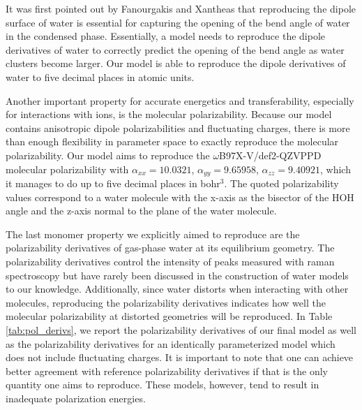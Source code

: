 \documentclass[journal=jctcce,manuscript=article]{achemso}
\begin{document}
It was first pointed out by Fanourgakis and Xantheas that reproducing the dipole surface of water is essential for capturing the opening of the bend angle of water in the condensed phase.\cite{fanourgakis2006flexible} Essentially, a model needs to reproduce the dipole derivatives of water to correctly predict the opening of the bend angle as water clusters become larger. Our model is able to reproduce the dipole derivatives of water to five decimal places in atomic units.

Another important property for accurate energetics and transferability, especially for interactions with ions, is the molecular polarizability. Because our model contains anisotropic dipole polarizabilities and fluctuating charges, there is more than enough flexibility in parameter space to exactly reproduce the molecular polarizability. Our model aims to reproduce the $\omega$B97X-V/def2-QZVPPD molecular polarizability with $\alpha_{xx}=10.0321$, $\alpha_{yy}=9.65958$, $\alpha_{zz}=9.40921$, which it manages to do up to five decimal places in bohr$^3$. The quoted polarizability values correspond to a water molecule with the x-axis as the bisector of the HOH angle and the z-axis normal to the plane of the water molecule.

The last monomer property we explicitly aimed to reproduce are the polarizability derivatives of gas-phase water at its equilibrium geometry. The polarizability derivatives control the intensity of peaks measured with raman spectroscopy but have rarely been discussed in the construction of water models to our knowledge. Additionally, since water distorts when interacting with other molecules, reproducing the polarizability derivatives indicates how well the molecular polarizability at distorted geometries will be reproduced. In Table \ref{tab:pol_derivs}, we report the polarizability derivatives of our final model as well as the polarizability derivatives for an identically parameterized model which does not include fluctuating charges. It is important to note that one can achieve better agreement with reference polarizability derivatives if that is the only quantity one aims to reproduce. These models, however, tend to result in inadequate polarization energies.
\end{document}
